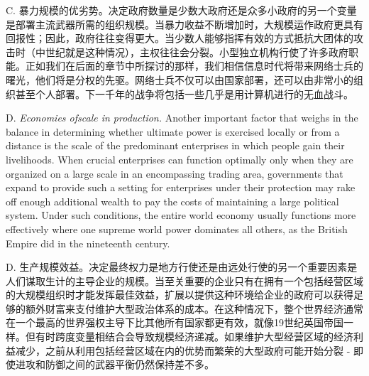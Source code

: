 \begin{Parallel}{97mm}{45mm}
  \ParallelRText
  {C. 暴力规模的优劣势。决定政府数量是少数大政府还是众多小政府的另一个变量是部署主流武器所需的组织规模。当暴力收益不断增加时，大规模运作政府更具有回报性；因此，政府往往变得更大。当少数人能够指挥有效的方式抵抗大团体的攻击时（中世纪就是这种情况），主权往往会分裂。小型独立机构行使了许多政府职能。正如我们在后面的章节中所探讨的那样，我们相信信息时代将带来网络士兵的曙光，他们将是分权的先驱。网络士兵不仅可以由国家部署，还可以由非常小的组织甚至个人部署。下一千年的战争将包括一些几乎是用计算机进行的无血战斗。}
  \ParallelPar



  \ParallelLText
  {D. \emph{Economies ofscale in production.} Another important factor that weighs in the balance in determining whether ultimate power is exercised locally or from a distance is the scale of the predominant enterprises in which people gain their livelihoods. When crucial enterprises can function optimally only when they are organized on a large scale in an encompassing trading area, governments that expand to provide such a setting for enterprises under their protection may rake off enough additional wealth to pay the costs of maintaining a large political system. Under such conditions, the entire world economy usually functions more effectively where one supreme world power dominates all others, as the British Empire did in the nineteenth century. }
  
  \ParallelRText
  {D. 生产规模效益。决定最终权力是地方行使还是由远处行使的另一个重要因素是人们谋取生计的主导企业的规模。当至关重要的企业只有在拥有一个包括经营区域的大规模组织时才能发挥最佳效益，扩展以提供这种环境给企业的政府可以获得足够的额外财富来支付维护大型政治体系的成本。在这种情况下，整个世界经济通常在一个最高的世界强权主导下比其他所有国家都更有效，就像19世纪英国帝国一样。但有时跨度变量相结合会导致规模经济递减。如果维护大型经营区域的经济利益减少，之前从利用包括经营区域在内的优势而繁荣的大型政府可能开始分裂 - 即使进攻和防御之间的武器平衡仍然保持差不多。}
  \ParallelPar


  \ParallelPar


\end{Parallel}
